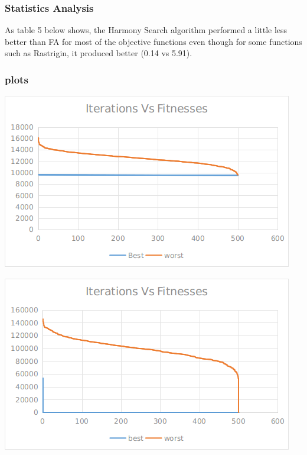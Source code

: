 \documentclass[12pt]{article}
\begin{document}
				\subsubsection{Statistics Analysis}
					As table 5 below shows, the Harmony Search algorithm performed a little less better than FA for most of the objective functions even though for some functions such as Rastrigin, it produced better (0.14 vs 5.91).
				
				\subsubsection{plots}
					\begin{minipage}{0.6\linewidth}
						\includegraphics[width=\linewidth]{37.png}
					\end{minipage}
					\hfill
					\begin{minipage}{0.6\linewidth}
						\includegraphics[width=\linewidth]{38.png}
					\end{minipage}
\end{document}
